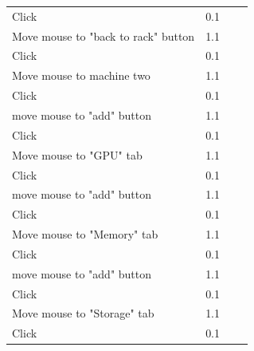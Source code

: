 \documentclass[11pt]{article}
\begin{document}
\begin{table}[]
{\begin{tabular}{llll}
					Click                                    & 0.1       &                                                 &     \\
					Move mouse to "back to rack" button      & 1.1       &                                                 &     \\
					Click                                    & 0.1       &                                                 &     \\
					Move mouse to machine two                & 1.1       &                                                 &     \\
					Click                                    & 0.1       &                                                 &     \\
					move mouse to "add" button               & 1.1       &                                                 &     \\
					Click                                    & 0.1       &                                                 &     \\
					Move mouse to "GPU" tab                  & 1.1       &                                                 &     \\
					Click                                    & 0.1       &                                                 &     \\
					move mouse to "add" button               & 1.1       &                                                 &     \\
					Click                                    & 0.1       &                                                 &     \\
					Move mouse to "Memory" tab               & 1.1       &                                                 &     \\
					Click                                    & 0.1       &                                                 &     \\
					move mouse to "add" button               & 1.1       &                                                 &     \\
					Click                                    & 0.1       &                                                 &     \\
					Move mouse to "Storage" tab              & 1.1       &                                                 &     \\
					Click                                    & 0.1       &                                                 &     \\

\end{tabular}}
\end{table}
\end{document}
